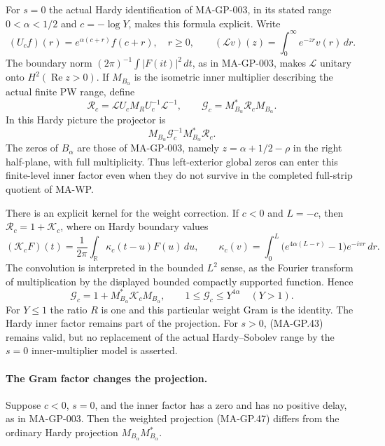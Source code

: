 For $s=0$ the actual Hardy identification of MA-GP-003,
in its stated range $0<\alpha<1/2$ and $c=-\log Y$,
makes this formula explicit.  Write
\[
 (U_cf)(r)=e^{\alpha(c+r)}f(c+r),\quad r\ge0,
 \qquad
 (\mathcal Lv)(z)=\int_0^\infty e^{-zr}v(r)\,dr.
 \tag{MA-GP.45}
\]
The boundary norm $(2\pi)^{-1}\int|F(it)|^2\,dt$, as in
MA-GP-003, makes $\mathcal L$ unitary onto
$H^2(\operatorname{Re}z>0)$.  If $M_{B_\alpha}$ is the
isometric inner multiplier describing the actual finite PW
range, define
\[
 \mathcal R_c=\mathcal L U_cM_RU_c^{-1}\mathcal L^{-1},
 \qquad
 \mathcal G_c=M_{B_\alpha}^*\mathcal R_cM_{B_\alpha}.
 \tag{MA-GP.46}
\]
In this Hardy picture the projector is
\[
 M_{B_\alpha}\mathcal G_c^{-1}
                   M_{B_\alpha}^*\mathcal R_c.
 \tag{MA-GP.47}
\]
The zeros of $B_\alpha$ are those of MA-GP-003, namely
$z=\alpha+1/2-\rho$ in the right half-plane, with full
multiplicity.  Thus left-exterior global zeros can enter this
finite-level inner factor even when they do not survive in
the completed full-strip quotient of MA-WP.

There is an explicit kernel for the weight correction.
If $c<0$ and $L=-c$, then $\mathcal R_c=1+\mathcal K_c$,
where on Hardy boundary values
\[
 (\mathcal K_cF)(t)=\frac1{2\pi}\int_{\mathbb R}
                       \kappa_c(t-u)F(u)\,du,
 \qquad
 \kappa_c(v)=\int_0^L
            \bigl(e^{4\alpha(L-r)}-1\bigr)e^{-ivr}\,dr.
 \tag{MA-GP.48}
\]
The convolution is interpreted in the bounded $L^2$ sense,
as the Fourier transform of multiplication by the displayed
bounded compactly supported function.  Hence
\[
       \mathcal G_c=1+M_{B_\alpha}^*\mathcal K_cM_{B_\alpha},
       \qquad 1\le\mathcal G_c\le Y^{4\alpha}
                    \quad(Y>1).
 \tag{MA-GP.49}
\]
For $Y\le1$ the ratio $R$ is one and this particular weight
Gram is the identity.  The Hardy inner factor remains part
of the projection.  For $s>0$, (MA-GP.43) remains valid, but
no replacement of the actual Hardy--Sobolev range by the
$s=0$ inner-multiplier model is asserted.

\paragraph{The Gram factor changes the projection.}
Suppose $c<0$, $s=0$, and the inner factor has a zero and
has no positive delay, as in MA-GP-003.  Then the weighted
projection (MA-GP.47) differs from the ordinary Hardy
projection $M_{B_\alpha}M_{B_\alpha}^*$.

